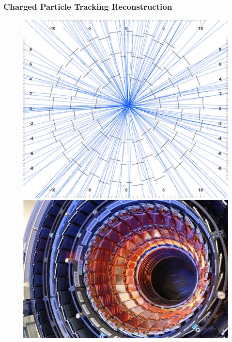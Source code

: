\begin{frame}
\frametitle{Charged Particle Tracking Reconstruction}

\begin{figure}[tbp]
\centering


\includegraphics[width=0.5\linewidth]{images/PU50ns_run2_RPhi.png}
\includegraphics[width=0.5\linewidth]{images/0610026_01-A5-at-72-dpi.jpg}

\end{figure}


\end{frame}


